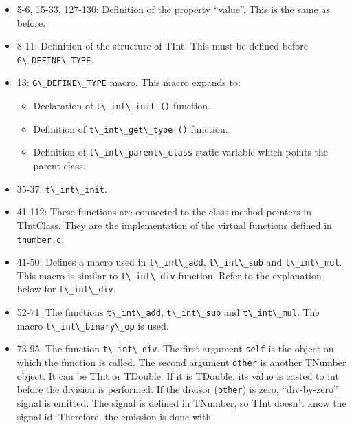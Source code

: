 \begin{itemize}
\tightlist
\item
  5-6, 15-33, 127-130: Definition of the property ``value''. This is the
  same as before.
\item
  8-11: Definition of the structure of TInt. This must be defined before
  \passthrough{\lstinline!G\_DEFINE\_TYPE!}.
\item
  13: \passthrough{\lstinline!G\_DEFINE\_TYPE!} macro. This macro
  expands to:

  \begin{itemize}
  \tightlist
  \item
    Declaration of \passthrough{\lstinline!t\_int\_init ()!} function.
  \item
    Definition of \passthrough{\lstinline!t\_int\_get\_type ()!}
    function.
  \item
    Definition of \passthrough{\lstinline!t\_int\_parent\_class!} static
    variable which points the parent class.
  \end{itemize}
\item
  35-37: \passthrough{\lstinline!t\_int\_init!}.
\item
  41-112: These functions are connected to the class method pointers in
  TIntClass. They are the implementation of the virtual functions
  defined in \passthrough{\lstinline!tnumber.c!}.
\item
  41-50: Defines a macro used in \passthrough{\lstinline!t\_int\_add!},
  \passthrough{\lstinline!t\_int\_sub!} and
  \passthrough{\lstinline!t\_int\_mul!}. This macro is similar to
  \passthrough{\lstinline!t\_int\_div!} function. Refer to the
  explanation below for \passthrough{\lstinline!t\_int\_div!}.
\item
  52-71: The functions \passthrough{\lstinline!t\_int\_add!},
  \passthrough{\lstinline!t\_int\_sub!} and
  \passthrough{\lstinline!t\_int\_mul!}. The macro
  \passthrough{\lstinline!t\_int\_binary\_op!} is used.
\item
  73-95: The function \passthrough{\lstinline!t\_int\_div!}. The first
  argument \passthrough{\lstinline!self!} is the object on which the
  function is called. The second argument
  \passthrough{\lstinline!other!} is another TNumber object. It can be
  TInt or TDouble. If it is TDouble, its value is casted to int before
  the division is performed. If the divisor
  (\passthrough{\lstinline!other!}) is zero, ``div-by-zero'' signal is
  emitted. The signal is defined in TNumber, so TInt doesn't know the
  signal id. Therefore, the emission is done with

\end{itemize}
